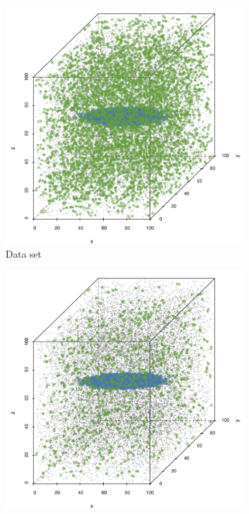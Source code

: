 \begin{figure}
\begin{subfigure}{0.23\textwidth}
				\includegraphics[keepaspectratio=true, width=\textwidth, height=0.23\textheight]{discussion/img/baakman_1_abs_error_mbeSmallerThansambe}
				\caption{Data set \baakmanOne}
				\label{fig:discussion:performance:mbeLowerError:baakman1}
			\end{subfigure}	
			\begin{subfigure}{0.23\textwidth}
				\centering
				\includegraphics[keepaspectratio=true, width=\textwidth, height=0.23\textheight]{discussion/img/baakman_4_abs_error_mbeSmallerThansambe}

\end{subfigure}
\end{figure}
